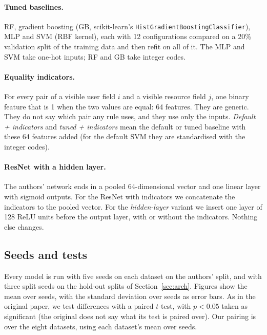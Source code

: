 \documentclass[11pt,a4paper]{article}
\begin{document}
\paragraph{Tuned baselines.} RF, gradient boosting (GB, scikit-learn's \texttt{HistGradientBoostingClassifier}), MLP and SVM (RBF kernel), each with 12 configurations compared on a 20\% validation split of the training data and then refit on all of it. The MLP and SVM take one-hot inputs; RF and GB take integer codes.
\paragraph{Equality indicators.} For every pair of a visible user field $i$ and a visible resource field $j$, one binary feature that is 1 when the two values are equal: 64 features. They are generic. They do not say which pair any rule uses, and they use only the inputs. \emph{Default + indicators} and \emph{tuned + indicators} mean the default or tuned baseline with these 64 features added (for the default SVM they are standardised with the integer codes).
\paragraph{ResNet with a hidden layer.} The authors' network ends in a pooled 64-dimensional vector and one linear layer with sigmoid outputs. For the ResNet with indicators we concatenate the indicators to the pooled vector. For the \emph{hidden-layer} variant we insert one layer of 128 ReLU units before the output layer, with or without the indicators. Nothing else changes.

\subsection{Seeds and tests}\label{sec:tests}
Every model is run with five seeds on each dataset on the authors' split, and with three split seeds on the hold-out splits of Section~\ref{sec:arch}. Figures show the mean over seeds, with the standard deviation over seeds as error bars. As in the original paper, we test differences with a paired $t$-test, with $p<0.05$ taken as significant (the original does not say what its test is paired over). Our pairing is over the eight datasets, using each dataset's mean over seeds.

\begin{table}[t]
\centering\footnotesize

\caption{Our runs against the F1 values read off the figures of \cite{nobi2022} (resolution about 0.015). Bold: more than \reproTol{} apart. \reproWithin{} of \reproCells{} cells are within \reproTol{}. The four MLP cells outside the tolerance are higher in our runs; the paper does not give the MLP's width or input. Our ResNet on 28k is below the published value, and we have no explanation for it.}
\label{tab:repro}
\end{table}
\end{document}
